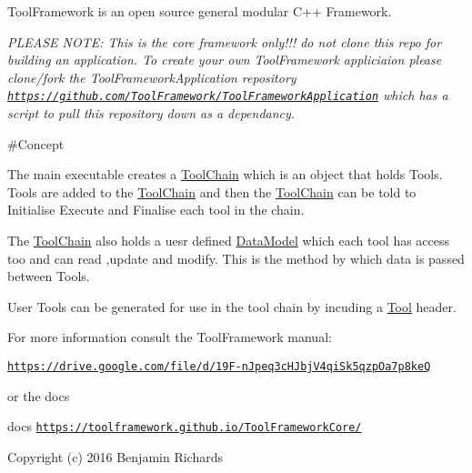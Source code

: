 Tool\-Framework is an open source general modular C++ Framework.

{\itshape P\-L\-E\-A\-S\-E N\-O\-T\-E\-: This is the core framework only!!! do not clone this repo for building an application. To create your own Tool\-Framework appliciaion please clone/fork the Tool\-Framework\-Application repository \href{https://github.com/ToolFramework/ToolFrameworkApplication}{\tt https\-://github.\-com/\-Tool\-Framework/\-Tool\-Framework\-Application} which has a script to pull this repository down as a dependancy.}



 \#\-Concept 



The main executable creates a \hyperlink{classToolChain}{Tool\-Chain} which is an object that holds Tools. Tools are added to the \hyperlink{classToolChain}{Tool\-Chain} and then the \hyperlink{classToolChain}{Tool\-Chain} can be told to Initialise Execute and Finalise each tool in the chain.

The \hyperlink{classToolChain}{Tool\-Chain} also holds a uesr defined \hyperlink{classDataModel}{Data\-Model} which each tool has access too and can read ,update and modify. This is the method by which data is passed between Tools.

User Tools can be generated for use in the tool chain by incuding a \hyperlink{classTool}{Tool} header.

For more information consult the Tool\-Framework manual\-:

\href{https://drive.google.com/file/d/19F-nJpeq3cHJbjV4qiSk5qzpOa7p8keQ}{\tt https\-://drive.\-google.\-com/file/d/19\-F-\/n\-Jpeq3c\-H\-Jbj\-V4qi\-Sk5qzp\-Oa7p8ke\-Q}

or the docs

docs \href{https://toolframework.github.io/ToolFrameworkCore/}{\tt https\-://toolframework.\-github.\-io/\-Tool\-Framework\-Core/}

Copyright (c) 2016 Benjamin Richards 